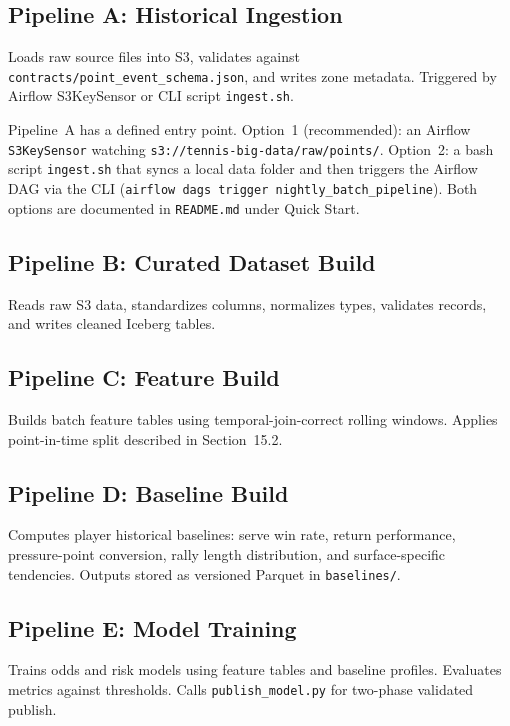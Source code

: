 \documentclass[11pt,a4paper]{article}
\begin{document}
\subsection{Pipeline A: Historical Ingestion}

Loads raw source files into S3, validates against \texttt{contracts/point\_event\_schema.json},
and writes zone metadata. Triggered by Airflow S3KeySensor or CLI script \texttt{ingest.sh}.

\begin{importantbox}
Pipeline~A has a defined entry point. Option~1 (recommended): an Airflow
\texttt{S3KeySensor} watching \texttt{s3://tennis-big-data/raw/points/}. Option~2: a bash script
\texttt{ingest.sh} that syncs a local data folder and then triggers the Airflow DAG via the CLI
(\texttt{airflow dags trigger nightly\_batch\_pipeline}). Both options are documented in
\texttt{README.md} under Quick Start.
\end{importantbox}

\subsection{Pipeline B: Curated Dataset Build}
Reads raw S3 data, standardizes columns, normalizes types, validates records, and writes cleaned
Iceberg tables.

\subsection{Pipeline C: Feature Build}
Builds batch feature tables using temporal-join-correct rolling windows. Applies point-in-time
split described in Section~15.2.

\subsection{Pipeline D: Baseline Build}
Computes player historical baselines: serve win rate, return performance, pressure-point
conversion, rally length distribution, and surface-specific tendencies. Outputs stored as
versioned Parquet in \texttt{baselines/}.

\subsection{Pipeline E: Model Training}
Trains odds and risk models using feature tables and baseline profiles. Evaluates metrics against
thresholds. Calls \texttt{publish\_model.py} for two-phase validated publish.
\end{document}

